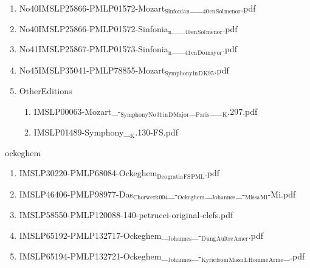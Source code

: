 \documentclass[11pt]{article}
\begin{document}
\begin{enumerate}
\begin{enumerate}
\item No40IMSLP25866-PMLP01572-Mozart$_{\text{Sinfonia}}$$_{\text{n}}$\_\_$_{\text{40}}$$_{\text{en}}$$_{\text{Sol}}$$_{\text{menor}}$.pdf
\label{sec-1-1-1-1-44-49-11-81}

\item No40IMSLP25866-PMLP01572-Sinfonia$_{\text{n}}$\_\_$_{\text{40}}$$_{\text{en}}$$_{\text{Sol}}$$_{\text{menor}}$.pdf
\label{sec-1-1-1-1-44-49-11-82}

\item No41IMSLP25867-PMLP01573-Sinfonia$_{\text{n}}$\_\_$_{\text{41}}$$_{\text{en}}$$_{\text{Do}}$$_{\text{mayor}}$.pdf
\label{sec-1-1-1-1-44-49-11-83}

\item No45IMSLP35041-PMLP78855-Mozart$_{\text{Symphony}}$$_{\text{in}}$$_{\text{D}}$$_{\text{K95}}$.pdf
\label{sec-1-1-1-1-44-49-11-84}

\item OtherEditions
\label{sec-1-1-1-1-44-49-11-85}
\begin{enumerate}
\item IMSLP00063-Mozart\_-$_{\text{Symphony}}$$_{\text{No}}$$_{\text{31}}$$_{\text{in}}$$_{\text{D}}$$_{\text{Major}}$\_$_{\text{Paris}}$\_\_$_{\text{K}}$.297.pdf
\label{sec-1-1-1-1-44-49-11-85-1}

\item IMSLP01489-Symphony\_$_{\text{K}}$.130-FS.pdf
\label{sec-1-1-1-1-44-49-11-85-2}
\end{enumerate}
\end{enumerate}
\end{enumerate}

\item ockeghem
\label{sec-1-1-1-1-44-50}
\begin{enumerate}
\item IMSLP30220-PMLP68084-Ockeghem$_{\text{Deo}}$$_{\text{gratia}}$$_{\text{FS}}$$_{\text{PML}}$.pdf
\label{sec-1-1-1-1-44-50-1}

\item IMSLP46406-PMLP98977-Das$_{\text{Chorwerk}}$$_{\text{004}}$\_-$_{\text{Ockeghem}}$\_$_{\text{Johannes}}$\_-$_{\text{Missa}}$$_{\text{Mi}}$-Mi.pdf
\label{sec-1-1-1-1-44-50-2}

\item IMSLP58550-PMLP120088-140-petrucci-original-clefs.pdf
\label{sec-1-1-1-1-44-50-3}

\item IMSLP65192-PMLP132717-Ockeghem\_$_{\text{Johannes}}$\_-$_{\text{D}}$$_{\text{ung}}$$_{\text{Aultre}}$$_{\text{Amer}}$.pdf
\label{sec-1-1-1-1-44-50-4}

\item IMSLP65194-PMLP132721-Ockeghem\_$_{\text{Johannes}}$\_-$_{\text{Kyrie}}$$_{\text{from}}$$_{\text{Missa}}$$_{\text{L}}$$_{\text{Homme}}$$_{\text{Arme}}$\_.pdf
\label{sec-1-1-1-1-44-50-5}
\end{enumerate}
\end{document}
